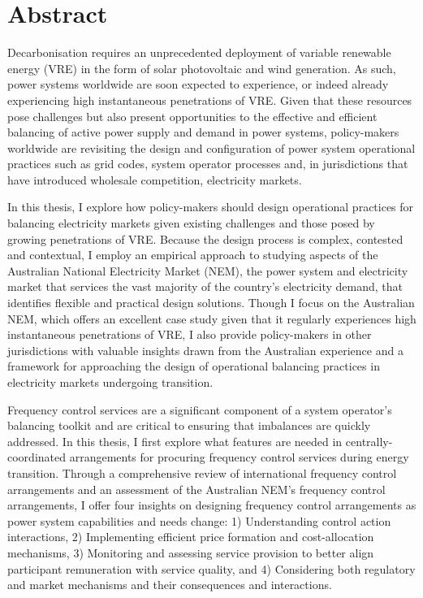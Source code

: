 \documentclass[12pt,a4paper,]{report}
\begin{document}

\hypertarget{abstract}{%
\chapter*{Abstract}\label{abstract}}

Decarbonisation requires an unprecedented deployment of variable
renewable energy (VRE) in the form of solar photovoltaic and wind
generation. As such, power systems worldwide are soon expected to
experience, or indeed already experiencing high instantaneous
penetrations of VRE. Given that these resources pose challenges but also
present opportunities to the effective and efficient balancing of active
power supply and demand in power systems, policy-makers worldwide are
revisiting the design and configuration of power system operational
practices such as grid codes, system operator processes and, in
jurisdictions that have introduced wholesale competition, electricity
markets.

In this thesis, I explore how policy-makers should design operational
practices for balancing electricity markets given existing challenges
and those posed by growing penetrations of VRE. Because the design
process is complex, contested and contextual, I employ an empirical
approach to studying aspects of the Australian National Electricity
Market (NEM), the power system and electricity market that services the
vast majority of the country's electricity demand, that identifies
flexible and practical design solutions. Though I focus on the
Australian NEM, which offers an excellent case study given that it
regularly experiences high instantaneous penetrations of VRE, I also
provide policy-makers in other jurisdictions with valuable insights
drawn from the Australian experience and a framework for approaching the
design of operational balancing practices in electricity markets
undergoing transition.

Frequency control services are a significant component of a system
operator's balancing toolkit and are critical to ensuring that
imbalances are quickly addressed. In this thesis, I first explore what
features are needed in centrally-coordinated arrangements for procuring
frequency control services during energy transition. Through a
comprehensive review of international frequency control arrangements and
an assessment of the Australian NEM's frequency control arrangements, I
offer four insights on designing frequency control arrangements as power
system capabilities and needs change: 1) Understanding control action
interactions, 2) Implementing efficient price formation and
cost-allocation mechanisms, 3) Monitoring and assessing service
provision to better align participant remuneration with service quality,
and 4) Considering both regulatory and market mechanisms and their
consequences and interactions.
\end{document}
